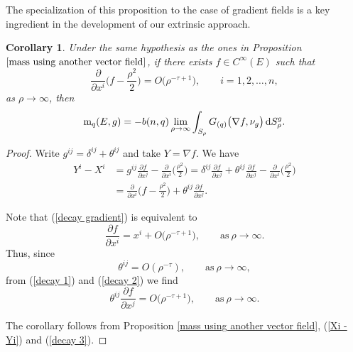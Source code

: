 \documentclass[pdftex]{sigma}
\numberwithin{equation}{section}
\newtheorem{Corollary}[Theorem]{Corollary}
\begin{document}
The specialization of this proposition to the case of gradient fields is a key ingredient
in the development of our extrinsic approach.
\begin{Corollary} \label{gradient field}
  Under the same hypothesis as the ones in Proposition $\ref{mass using another vector field}$, if there exists ${f \in C^{\infty}(E)}$ such that
\begin{equation} \label{decay gradient}
  \frac{\partial}{\partial x^i} \biggl( f - \frac{\rho^2}{2} \biggr) = O\bigl(\rho^{-\tau +1}\bigr), \qquad i = 1, 2, \ldots, n,
\end{equation}
as $\rho \to \infty$, then
\begin{equation*}
  \mathrm{m}_q(E,g) = -b(n,q) \lim_{\rho \to \infty} \int_{S_\rho} G_{(q)} \bigl(\nabla f, \nu_g\bigr) \, {\rm d}S_\rho^g.
\end{equation*}
\end{Corollary}
\begin{proof}
Write $g^{ij} = \delta^{ij} + \theta^{ij}$ and take $Y = \nabla f$. We have
\begin{align}
  Y^i - X^i& = g^{ij} \frac{\partial f}{\partial x^j} - \frac{\partial}{\partial x^i} \biggl( \frac{\rho^2}{2} \biggr)
  = \delta^{ij} \frac{\partial f}{\partial x^j} + \theta^{ij}\frac{\partial f}{\partial x^j} - \frac{\partial}{\partial x^i} \biggl( \frac{\rho^2}{2} \biggr) \nonumber \\
  & = \frac{\partial}{\partial x^i} \biggl( f - \frac{\rho^2}{2} \biggr) + \theta^{ij}\frac{\partial f}{\partial x^j}. \label{Xi - Yi}
\end{align}

Note that (\ref{decay gradient}) is equivalent to
\begin{equation} \label{decay 1}
  \frac{\partial f}{\partial x^i} = x^i + O\bigl(\rho^{-\tau + 1}\bigr), \qquad \text{as} \  \rho \to \infty.
\end{equation}
Thus, since
\begin{equation} \label{decay 2}
  \theta^{ij} = O( \rho^{-\tau}), \qquad \text{as} \  \rho \to \infty,
\end{equation}
from (\ref{decay 1}) and (\ref{decay 2}) we find
\begin{equation} \label{decay 3}
  \theta^{ij}\frac{\partial f}{\partial x^j} = O\bigl( \rho^{-\tau + 1} \bigr), \qquad \text{as} \  \rho \to \infty.
\end{equation}

The corollary follows from Proposition \ref{mass using another vector field}, (\ref{Xi - Yi}) and (\ref{decay 3}).
\end{proof}
\end{document}
